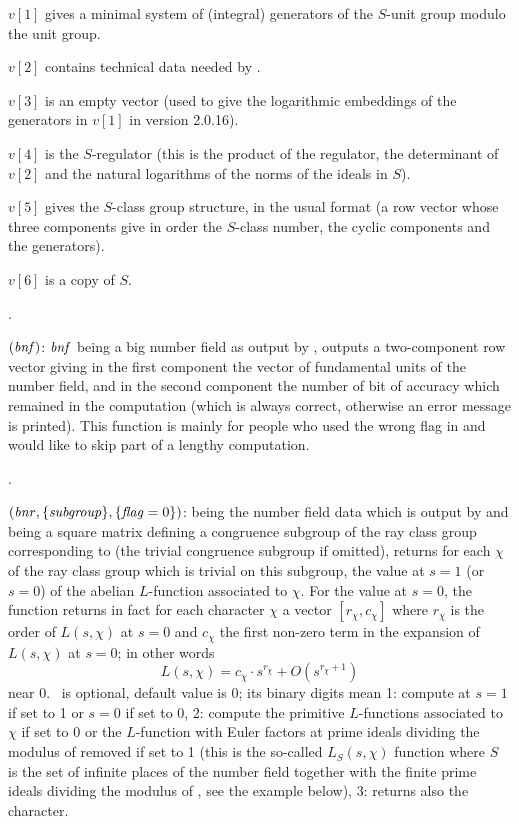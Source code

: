 $v[1]$ gives a minimal system of (integral) generators of the $S$-unit group
modulo the unit group.

$v[2]$ contains technical data needed by .

$v[3]$ is an empty vector (used to give the logarithmic embeddings of the
generators in $v[1]$ in version 2.0.16).

$v[4]$ is the $S$-regulator (this is the product of the regulator, the
determinant of $v[2]$ and the natural logarithms of the norms of the ideals
in $S$).

$v[5]$ gives the $S$-class group structure, in the usual format
(a row vector whose three components give in order the $S$-class number,
the cyclic components and the generators).

$v[6]$ is a copy of $S$.

.

$(\hbox{\it bnf\/})$: $\hbox{\it bnf\/}$ being a big number field as
output by , outputs a two-component row vector giving in the
first component the vector of fundamental units of the number field, and in
the second component the number of bit of accuracy which remained in the
computation (which is always correct, otherwise an error message is printed).
This function is mainly for people who used the wrong flag in 
and would like to skip part of a lengthy  computation.

.

$(\hbox{\it bnr\/},\{\hbox{\it subgroup\/}\},\{\hbox{\it f\kern0pt lag\/}=0\})$:
 being the number field data which is output by
 and  being a square matrix defining a
congruence subgroup of the ray class group corresponding to 
(the trivial congruence subgroup if omitted), returns for each
 $\chi$ of the ray class group which is trivial on this
subgroup, the value at $s = 1$ (or $s = 0$) of the abelian
$L$-function associated to $\chi$. For the value at $s = 0$, the
function returns in fact for each character $\chi$ a vector $[r_\chi ,
c_\chi]$ where $r_\chi$ is the order of $L(s, \chi)$ at $s = 0$ and
$c_\chi$ the first non-zero term in the expansion of $L(s,
\chi)$ at $s = 0$; in other words
%
$$L(s, \chi) = c_\chi \cdot s^{r_\chi} + O(s^{r_\chi + 1})$$
%
\noindent near $0$. \fl\ is optional, default value is 0; its binary digits
mean 1: compute at $s = 1$ if set to 1 or $s = 0$ if set to 0, 2: compute
the primitive $L$-functions associated to $\chi$ if set to 0 or the
$L$-function with Euler factors at prime ideals dividing the modulus of
 removed if set to 1 (this is the so-called $L_S(s, \chi)$
function where $S$ is the set of infinite places of the number field
together with the finite prime ideals dividing the modulus of ,
see the example below), 3: returns also the character.

